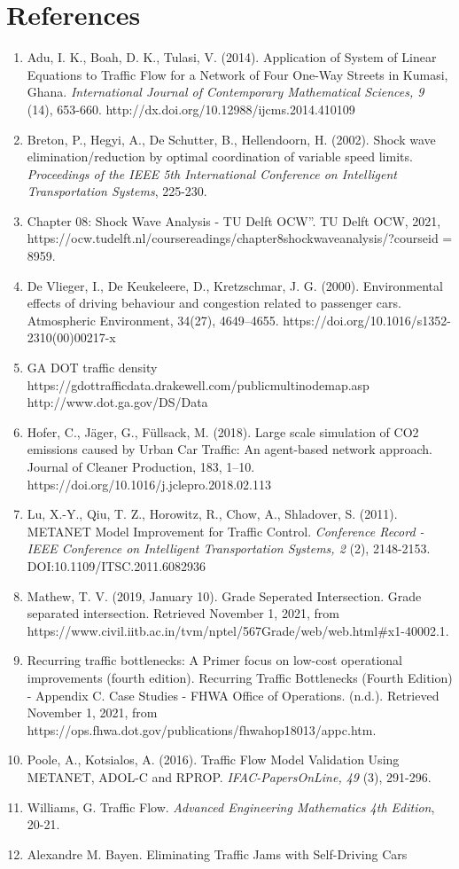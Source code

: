 \documentclass{article}
\begin{document}
\section*{References}
\label{sec:headings}
\begin{enumerate}
    \item Adu, I. K., Boah, D. K., Tulasi, V. (2014). Application of System of Linear Equations to Traffic Flow for a Network of Four One-Way Streets in Kumasi, Ghana. \textit{International Journal of Contemporary Mathematical Sciences, 9} (14), 653-660. http://dx.doi.org/10.12988/ijcms.2014.410109 
    \item Breton, P., Hegyi, A., De Schutter, B., Hellendoorn, H. (2002). Shock wave elimination/reduction by optimal coordination of variable speed limits. \textit{Proceedings of the IEEE 5th International Conference on Intelligent Transportation Systems}, 225-230.
    \item Chapter 08: Shock Wave Analysis - TU Delft OCW”. TU Delft OCW, 2021, https://ocw.tudelft.nl/coursereadings/chapter8shockwaveanalysis/?courseid = 8959.
    \item De Vlieger, I., De Keukeleere, D., Kretzschmar, J. G. (2000). Environmental effects of driving behaviour and congestion related to passenger cars. Atmospheric Environment, 34(27), 4649–4655. https://doi.org/10.1016/s1352-2310(00)00217-x 
    \item GA DOT traffic density https://gdottrafficdata.drakewell.com/publicmultinodemap.asp 		http://www.dot.ga.gov/DS/Data
    \item Hofer, C., Jäger, G., Füllsack, M. (2018). Large scale simulation of CO2 emissions caused by Urban Car Traffic: An agent-based network approach. Journal of Cleaner Production, 183, 1–10. https://doi.org/10.1016/j.jclepro.2018.02.113 
    \item Lu, X.-Y., Qiu, T. Z., Horowitz, R., Chow, A., Shladover, S. (2011). METANET Model Improvement for Traffic Control. \textit{Conference Record - IEEE Conference on Intelligent Transportation Systems, 2} (2), 2148-2153. DOI:10.1109/ITSC.2011.6082936
    \item Mathew, T. V. (2019, January 10). Grade Seperated Intersection. Grade separated intersection. Retrieved November 1, 2021, from https://www.civil.iitb.ac.in/tvm/nptel/567Grade/web/web.html\#x1-40002.1. 
    \item Recurring traffic bottlenecks: A Primer focus on low-cost operational improvements (fourth edition). Recurring Traffic Bottlenecks (Fourth Edition) - Appendix C. Case Studies - FHWA Office of Operations. (n.d.). Retrieved November 1, 2021, from https://ops.fhwa.dot.gov/publications/fhwahop18013/appc.htm. 
    \item Poole, A., Kotsialos, A. (2016). Traffic Flow Model Validation Using METANET, ADOL-C and RPROP. \textit{IFAC-PapersOnLine, 49} (3), 291-296. 
    \item Williams, G. Traffic Flow. \textit{Advanced Engineering Mathematics 4th Edition}, 20-21.
    \item Alexandre M. Bayen. Eliminating Traffic Jams with Self-Driving Cars
\end{enumerate}
\end{document}
